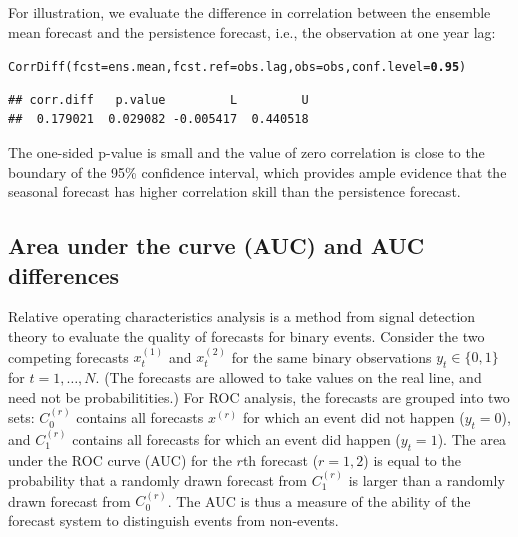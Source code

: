\documentclass[article]{jss}\usepackage[]{graphicx}\usepackage[]{color}
\makeatletter
\newcommand{\hlnum}[1]{\textcolor[rgb]{0.502,0,0.502}{\textbf{#1}}}%
\newcommand{\hlstd}[1]{\textcolor[rgb]{0,0,0}{#1}}%
\newcommand{\hlkwc}[1]{\textcolor[rgb]{0,0.502,0.753}{#1}}%
\newcommand{\hlkwd}[1]{\textcolor[rgb]{0,0.267,0.4}{#1}}%
\newenvironment{kframe}{%
 \def\at@end@of@kframe{}%
 \ifinner\ifhmode%
  \def\at@end@of@kframe{\end{minipage}}%
  \begin{minipage}{\columnwidth}%
 \fi\fi%
 \def\FrameCommand##1{\hskip\@totalleftmargin \hskip-\fboxsep
 \colorbox{shadecolor}{##1}\hskip-\fboxsep
     \hskip-\linewidth \hskip-\@totalleftmargin \hskip\columnwidth}%
 \MakeFramed {\advance\hsize-\width
   \@totalleftmargin\z@ \linewidth\hsize
   \@setminipage}}%
 {\par\unskip\endMakeFramed%
 \at@end@of@kframe}
\newenvironment{knitrout}{}{} %
\makeatother
\begin{document}
For illustration, we evaluate the difference in correlation between the ensemble mean forecast and the persistence forecast, i.e., the observation at one year lag:
%
\begin{knitrout}
\color{fgcolor}\begin{kframe}
\begin{alltt}
\hlkwd{CorrDiff}\hlstd{(}\hlkwc{fcst}\hlstd{=ens.mean,} \hlkwc{fcst.ref}\hlstd{=obs.lag,} \hlkwc{obs}\hlstd{=obs,} \hlkwc{conf.level}\hlstd{=}\hlnum{0.95}\hlstd{)}
\end{alltt}
\begin{verbatim}
## corr.diff   p.value         L         U 
##  0.179021  0.029082 -0.005417  0.440518
\end{verbatim}
\end{kframe}
\end{knitrout}
%
The one-sided p-value is small and the value of zero correlation is close to the boundary of the 95\% confidence interval, which provides ample evidence that the seasonal forecast has higher correlation skill than the persistence forecast.


\subsection{Area under the curve (AUC) and AUC differences}

Relative operating characteristics \citep[ROC, ][]{mason2002areas} analysis is a method from signal detection theory to evaluate the quality of forecasts for binary events.
Consider the two competing forecasts $x^{(1)}_t$ and $x^{(2)}_t$ for the same binary observations $y_t \in \{0, 1\}$ for $t=1,\dots,N$.
(The forecasts are allowed to take values on the real line, and need not be probabilitities.)
For ROC analysis, the forecasts are grouped into two sets: $C^{(r)}_0$ contains all forecasts $x^{(r)}$ for which an event did not happen ($y_t=0$), and $C^{(r)}_1$ contains all forecasts for which an event did happen ($y_t = 1$).
The area under the ROC curve (AUC) for the $r$th forecast ($r=1,2$) is equal to the probability that a randomly drawn forecast from $C^{(r)}_1$ is larger than a randomly drawn forecast from $C^{(r)}_0$.
The AUC is thus a measure of the ability of the forecast system to distinguish events from non-events.
\end{document}
